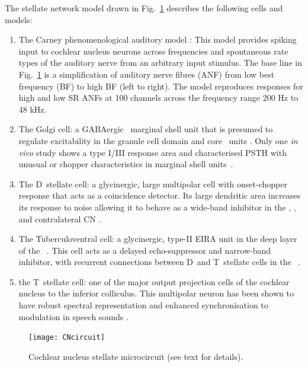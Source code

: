   The stellate
network model drawn in Fig.~\ref{fig:microcircuit} describes the following cells
and models:
\begin{enumerate}
\item The Carney phenomenological auditory model \citet{ZilanyBruceEtAl:2009}:
  This model provides spiking input to cochlear nucleus neurons across
  frequencies and spontaneous rate types of the auditory nerve from an arbitrary
  input stimulus. The base line in Fig.~\ref{fig:microcircuit} is a
  simplification of auditory nerve fibres (ANF) from low best frequency (BF) to
  high BF (left to right). The model reproduces responses for high and low SR
  ANFs at 100 channels across the frequency range 200 Hz to 48 kHz.
\item The Golgi cell: a {GABA}ergic \VCN~marginal shell unit that is presumed to
  regulate excitability in the granule cell domain and core \VCN~units
  \citep{FerragamoGoldingEtAl:1998}. Only one \textit{in vivo} study shows a
  type I/III response area and characterised {PSTH} with unusual or chopper
  characteristics in marginal shell units~\citep{GhoshalKim:1997}.
\item The D~stellate cell: a glycinergic, large multipolar cell with
  onset-chopper \PSTH response that acts as a coincidence detector. Its large
  dendritic area increases its response to noise allowing it to behave as a
  wide-band inhibitor in the \VCN, \DCN, and contralateral CN
  \citep{SmithMassieEtAl:2005,ArnottWallaceEtAl:2004,NeedhamPaolini:2007}.
\item The Tuberculoventral cell: a glycinergic, type-II {EIRA} unit in the deep
  layer of the \DCN~\citep{SpirouDavisEtAl:1999}.  This cell acts as a delayed
  echo-suppressor and narrow-band inhibitor, with recurrent connections between
  D~and T~stellate cells in the \VCN\
  \citep{Alibardi:2006,OertelWickesberg:1993,WickesbergWhitlonEtAl:1991}.
\item the T~stellate cell: one of the major output projection cells of the
  cochlear nucleus to the inferior colliculus. This multipolar neuron has been
  shown to have robust spectral representation and enhanced synchronisation to
  modulation in speech sounds
  \citep{BlackburnSachs:1990,KeilsonRichardsEtAl:1997}.
\end{enumerate}

\begin{figure}[ht!]
  \centering
  \texttt{[image: CNcircuit]}
  \caption[Cochlear nucleus stellate microcircuit]{Cochlear nucleus stellate microcircuit (see text for details). }
  \label{fig:microcircuit}
\end{figure}

